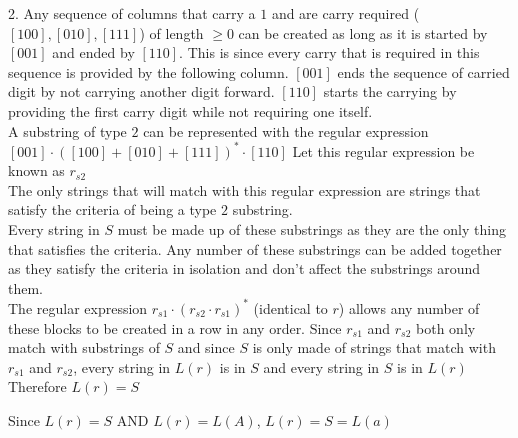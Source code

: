 \documentclass[11pt]{article}
\newcommand{\And}{\mbox{ AND }}
\begin{document}
\begin{enumerate}
\begin{solution}
2. Any sequence of columns that carry a $1$ and are carry required ($[100], [010], [111]$) of length $\ge 0$ can be created as long as it is started by $[001]$ and ended by $[110]$.
This is since every carry that is required in this sequence is provided by the following column. $[001]$ ends the sequence of carried digit by not carrying another digit forward. $[110]$ starts the carrying by providing the first carry digit while not requiring one itself.\\
A substring of type $2$ can be represented with the regular expression\\
$[001]\cdot ([100] + [010] + [111])^* \cdot [110]$ Let this regular expression be known as $r_{s2}$\\
The only strings that will match with this regular expression are strings that satisfy the criteria of being a type $2$ substring.\\

Every string in $S$ must be made up of these substrings as they are the only thing that satisfies the criteria. Any number of these substrings can be added together as they satisfy the criteria in isolation and don't affect the substrings around them.\\

The regular expression $r_{s1} \cdot (r_{s2} \cdot r_{s1})^*$ (identical to $r$) allows any number of these blocks to be created in a row in any order. Since $r_{s1}$ and $r_{s2}$ both only match with substrings of $S$ and since $S$ is only made of strings that match with $r_{s1}$ and $r_{s2}$, every string in $L(r)$ is in $S$ and every string in $S$ is in $L(r)$\\
Therefore $L(r) = S$

Since $L(r) = S \And L(r) = L(A)$, $L(r) = S = L(a)$

\end{solution}
\end{enumerate}
\end{document}
